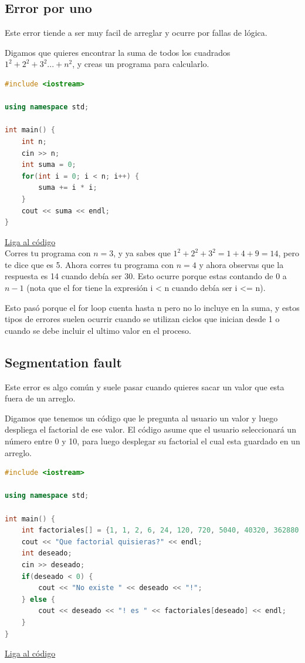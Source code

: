 \documentclass{article}
\begin{document}
\subsection{Error por uno}
Este error tiende a ser muy facil de arreglar y ocurre por fallas de lógica.

Digamos que quieres encontrar la suma de todos los cuadrados $1^2 + 2^2 + 3^2 ... + n^2$, y creas un programa para calcularlo.

\begin{lstlisting}[language=C++, caption=Error por uno]
#include <iostream>

using namespace std;

int main() {
    int n;
    cin >> n;
    int suma = 0;
    for(int i = 0; i < n; i++) {
        suma += i * i;
    }
    cout << suma << endl;
}
\end{lstlisting}
\href{https://repl.it/@Jamesscn/Sumás-Cuadrados}{Liga al código}\\

Corres tu programa con $n = 3$, y ya sabes que $1^2 + 2^2 + 3^2 = 1 + 4 + 9 = 14$, pero te dice que es 5. Ahora corres tu programa con $n = 4$ y ahora observas que la respuesta es 14 cuando debía ser 30. Esto ocurre porque estas contando de $0$ a $n-1$ (nota que el for tiene la expresión i < n cuando debía ser i <= n).

Esto pasó porque el for loop cuenta hasta n pero no lo incluye en la suma, y estos tipos de errores suelen ocurrir cuando se utilizan ciclos que inician desde 1 o cuando se debe incluir el ultimo valor en el proceso.

\subsection{Segmentation fault}
Este error es algo común y suele pasar cuando quieres sacar un valor que esta fuera de un arreglo.

Digamos que tenemos un código que le pregunta al usuario un valor y luego despliega el factorial de ese valor. El código asume que el usuario seleccionará un número entre 0 y 10, para luego desplegar su factorial el cual esta guardado en un arreglo.

\begin{lstlisting}[language=C++, caption=Error de inicialización]
#include <iostream>

using namespace std;

int main() {
    int factoriales[] = {1, 1, 2, 6, 24, 120, 720, 5040, 40320, 362880, 3628800};
    cout << "Que factorial quisieras?" << endl;
    int deseado;
    cin >> deseado;
    if(deseado < 0) {
        cout << "No existe " << deseado << "!";
    } else {
        cout << deseado << "! es " << factoriales[deseado] << endl;
    }
}
\end{lstlisting}
\href{https://repl.it/@Jamesscn/Indices-Inexistentes}{Liga al código}\\
\end{document}
